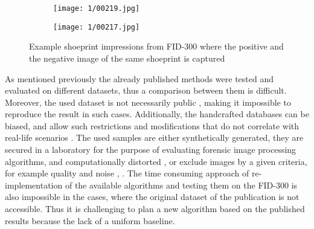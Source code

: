 \documentclass[draft,final]{vutinfth} %
\begin{document}
\begin{figure}[h]
  \centering
  \begin{subfigure}[t]{0.45\columnwidth}
    \centering
    \texttt{[image: 1/00219.jpg]}
	\caption{}
	\label{fig:int:cap:pos}
  \end{subfigure}
  \begin{subfigure}[t]{0.45\columnwidth}
    \centering
    \texttt{[image: 1/00217.jpg]}
	\caption{}
	\label{fig:int:cap:neg}
  \end{subfigure}
  \caption{Example shoeprint impressions from FID-300 where the positive and the negative image of the same shoeprint is captured}
  \label{fig:int:cap}
\end{figure}


\par
As mentioned previously the already published methods were tested and evaluated on different datasets, thus a comparison between them is difficult.
Moreover, the used dataset is not necessarily public \cite{katireddy2017novel}, \cite{dardi2009texture} making it impossible to reproduce the result in such cases.
Additionally, the handcrafted databases can be biased, and allow such restrictions and modifications that do not correlate with real-life scenarios \cite{rida2019forensic}.
The used samples are either synthetically generated, they are secured in a laboratory for the purpose of evaluating forensic image processing algorithms, and computationally distorted \cite{de2005automated}, \cite{gueham2008automatic} or exclude images by a given criteria, for example quality and noise \cite{dardi2009texture}, \cite{tang2010footwear}.
The time consuming approach of re-implementation of the available algorithms and testing them on the FID-300 is also impossible in the cases, where the original dataset of the publication is not accessible.
Thus it is challenging to plan a new algorithm based on the published results because the lack of a uniform baseline.
\end{document}
